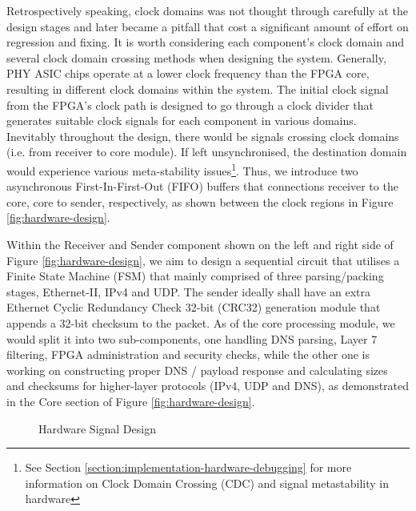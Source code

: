 \documentclass[a4paper]{report}
\begin{document}
Retrospectively speaking, clock domains was not thought through carefully at the design stages and later became a pitfall that cost a significant amount of effort on regression and fixing. It is worth considering each component's clock domain and several clock domain crossing methods when designing the system. Generally, PHY ASIC chips operate at a lower clock frequency than the FPGA core, resulting in different clock domains within the system. The initial clock signal from the FPGA's clock path is designed to go through a clock divider that generates suitable clock signals for each component in various domains. Inevitably throughout the design, there would be signals crossing clock domains (i.e. from receiver to core module). If left unsynchronised, the destination domain would experience various meta-stability issues\footnote{See Section \ref{section:implementation-hardware-debugging} for more information on Clock Domain Crossing (CDC) and signal metastability in hardware}. Thus, we introduce two asynchronous First-In-First-Out (FIFO) buffers that connections receiver to the core, core to sender, respectively, as shown between the clock regions in Figure \ref{fig:hardware-design}.

Within the Receiver and Sender component shown on the left and right side of Figure \ref{fig:hardware-design}, we aim to design a sequential circuit that utilises a Finite State Machine (FSM)  that mainly comprised of three parsing/packing stages, Ethernet-II, IPv4 and UDP. The sender ideally shall have an extra Ethernet Cyclic Redundancy Check 32-bit (CRC32) \cite{ieee802.3ethernet-2018} generation module that appends a 32-bit checksum to the packet. As of the core processing module, we would split it into two sub-components, one handling DNS parsing, Layer 7 filtering, FPGA administration and security checks, while the other one is working on constructing proper DNS / payload response and calculating sizes and checksums for higher-layer protocols (IPv4, UDP and DNS), as demonstrated in the Core section of Figure \ref{fig:hardware-design}.

\begin{figure}[h!]
  \caption{Hardware Signal Design}
  \label{fig:hardware-signal-design}
\end{figure}
\end{document}

